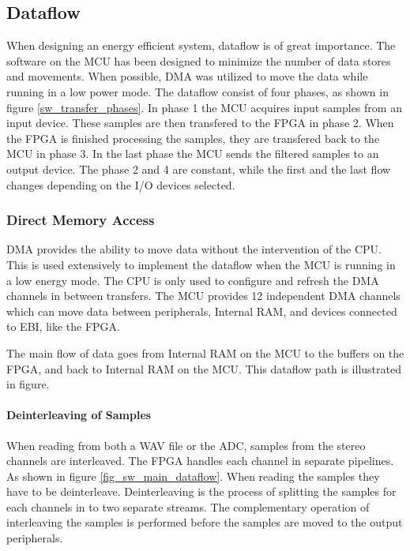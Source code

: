 
\subsection{Dataflow}
\newpage
When designing an energy efficient system, dataflow is of great importance. The
software on the MCU has been designed to minimize the number of data stores and
movements. When possible, DMA was utilized to move the data while running in a
low power mode. The dataflow consist of four phases, as shown in figure \ref{sw_transfer_phases}. 
In phase 1 the MCU acquires input samples from an input device. These samples are 
then transfered to the FPGA in phase 2. When the FPGA is finished processing the
samples, they are transfered back to the MCU in phase 3. In the last phase the MCU
sends the filtered samples to an output device.
The phase 2 and 4 are constant, while
the first and the last flow changes depending on the I/O devices selected. 



\subsubsection{Direct Memory Access} DMA provides the ability to move data
without the intervention of the CPU. This is used extensively to implement the
dataflow when the MCU is running in a low energy mode. The CPU is only used to configure
and refresh the DMA channels in between transfers. The MCU provides 12
independent DMA channels which can move data between peripherals, Internal RAM, and
devices connected to EBI, like the FPGA.

The main flow of data goes from Internal RAM on the MCU to the buffers on
the FPGA, and back to Internal RAM on the MCU. This dataflow path is illustrated in figure.

% 

\paragraph{Deinterleaving of Samples}
When reading from both a WAV file or the ADC, samples from the stereo channels
are interleaved. The FPGA handles each channel in separate pipelines. As shown 
in figure \ref{fig_sw_main_dataflow}. 
When reading the samples they have to be deinterleave. Deinterleaving is the
process of splitting the samples for each channels in to two separate streams. 
The complementary operation of interleaving the samples is performed before the samples 
are moved to the output peripherals.

